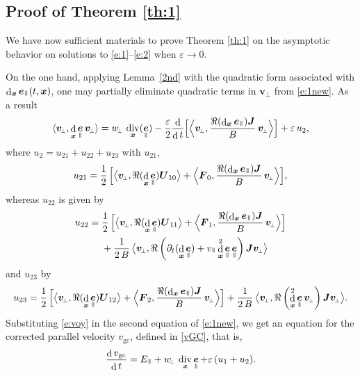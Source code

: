 \documentclass[10pt]{amsart}
\newcommand{\sperp}{{\scriptscriptstyle\perp}}
\newcommand{\blangle}{\bigl\langle}
\newcommand{\brangle}{\bigr\rangle}
\newcommand{\Blangle}{\Bigl\langle}
\newcommand{\Brangle}{\Bigr\rangle}
\let\eps\varepsilon
\let\d\partial
\DeclareMathOperator\dD{d}\let\dd\dD
\DeclareMathOperator{\Div}{div}
\theoremstyle{plain}
\theoremstyle{definition}
\newcommand{\be}{\begin{equation}}
\newcommand{\ee}{\end{equation}}
\newcommand\bF{{\boldsymbol F}}
\newcommand\bJ{{\boldsymbol J}}
\newcommand\bU{{\boldsymbol U}}
\newcommand\bfv{{\boldsymbol v}}
\newcommand\bfx{{\boldsymbol x}}
\DeclareMathOperator{\beD}{\boldsymbol{e}}
\newcommand\eDpar{\beD_\mypar}
\newcommand\vpar{v_\mypar}
\newcommand\bvperp{\bfv_{\!\sperp}}
\newcommand\eperp{w_{\!\sperp}}
\newcommand\Epar{E_\mypar}
\newcommand{\vGC}{v_\mathrm{gc}}
\newcommand{\mypar}{{\mkern3mu\vphantom{\perp}\vrule depth 0pt\mkern2mu\vrule depth 0pt\mkern3mu}}
\begin{document}
\subsection{Proof of Theorem \ref{th:1}}
\label{sec:proofTh1}

We have now sufficient materials to prove Theorem \ref{th:1} on the
asymptotic behavior on solutions to \eqref{e:1}--\eqref{e:2} when $\eps\rightarrow 0$.

On the one hand, applying Lemma~\ref{2nd} with the quadratic form associated with $\dD_\bfx \eDpar(t,\bfx)$, one may partially eliminate quadratic terms in $\bvperp$ from \eqref{e:1new}. As a result
\be
\label{e:voy}
\langle\bvperp, \dD_\bfx \eDpar\bvperp\rangle
=\eperp\, \Div_\bfx(\eDpar)
-\frac{\eps}{2}\frac{\dD}{\dD t}\Bigl[\Blangle \bvperp,\frac{\Re(\dD_\bfx\eDpar)\bJ}{B}\,\bvperp\Brangle\Bigr]
+\eps\, u_2,
\ee
where $u_2 =u_{21}+u_{22}+u_{23}$ with $u_{21}$,
\[
u_{21}
=\frac{1}{2} \,\Bigl[ \blangle \bvperp, \Re(\dD_\bfx
\eDpar)\bU_{10}\brangle + \Blangle
\bF_0,\frac{\Re(\dD_\bfx \eDpar)\bJ}{B}\,\bvperp\Brangle
\Bigr],
\]
whereas $u_{22}$ is given by
\begin{align*}
 u_{22}={}& \frac{1}{2} \,\Bigl[ \blangle \bvperp, \Re(\dD_\bfx \eDpar)\bU_{11}\brangle
+\Blangle \bF_1,
\frac{\Re(\dD_\bfx\eDpar)\bJ}{B}\,\bvperp\Brangle \Bigr]
\\
&+\frac{1}{2 \,B} \,\blangle \bvperp,
{\Re\left(\d_t(\dD_\bfx\eDpar)+\vpar\dD_\bfx^2 \eDpar\eDpar\right)\bJ}\bvperp \brangle
\end{align*}
and $u_{23}$ by
\[
u_{23}= \frac{1}{2} \,\Bigl[ \blangle \bvperp, \Re(\dD_\bfx \eDpar)\bU_{12}\brangle
+\Blangle \bF_2,
\frac{\Re(\dD_\bfx\eDpar)\bJ}{B}\,\bvperp\Brangle \Bigr]
+\frac{1}{2\,B} \,\blangle \bvperp,
{\Re\left(\dD_\bfx^2 \eDpar\bvperp\right)\bJ}\bvperp \brangle.
\]
Substituting \eqref{e:voy} in the second equation of \eqref{e:1new},
we get an equation for the corrected parallel velocity $\vGC$, defined in \eqref{vGC}, that is,
\be
\label{vp:2}
\frac{\dD\vGC }{\dD t} =\Epar+\eperp\, \Div_\bfx\eDpar+\eps\,(u_1 +u_2).
\ee
\end{document}

